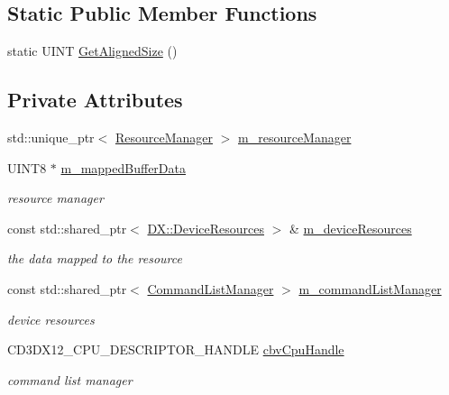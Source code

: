 \subsection*{Static Public Member Functions}
\begin{DoxyCompactItemize}
\item 
static U\+I\+NT \mbox{\hyperlink{class_constant_buffer_manager_a422de25f4764115e3bb1a747f231c7bd}{Get\+Aligned\+Size}} ()
\end{DoxyCompactItemize}
\subsection*{Private Attributes}
\begin{DoxyCompactItemize}
\item 
std\+::unique\+\_\+ptr$<$ \mbox{\hyperlink{class_resource_manager}{Resource\+Manager}} $>$ \mbox{\hyperlink{class_constant_buffer_manager_a8302ee559cb53baaf2233fcb20b867b4}{m\+\_\+resource\+Manager}}
\item 
U\+I\+N\+T8 $\ast$ \mbox{\hyperlink{class_constant_buffer_manager_a35b50fb75b21a3b98adca908b5c144c6}{m\+\_\+mapped\+Buffer\+Data}}
\begin{DoxyCompactList}\small\item\em resource manager \end{DoxyCompactList}\item 
const std\+::shared\+\_\+ptr$<$ \mbox{\hyperlink{class_d_x_1_1_device_resources}{D\+X\+::\+Device\+Resources}} $>$ \& \mbox{\hyperlink{class_constant_buffer_manager_a9514f5810d4492698ed04c48e67ef7e0}{m\+\_\+device\+Resources}}
\begin{DoxyCompactList}\small\item\em the data mapped to the resource \end{DoxyCompactList}\item 
const std\+::shared\+\_\+ptr$<$ \mbox{\hyperlink{class_command_list_manager}{Command\+List\+Manager}} $>$ \mbox{\hyperlink{class_constant_buffer_manager_aae03042ae999bf171e8dcffefdd4be63}{m\+\_\+command\+List\+Manager}}
\begin{DoxyCompactList}\small\item\em device resources \end{DoxyCompactList}\item 
C\+D3\+D\+X12\+\_\+\+C\+P\+U\+\_\+\+D\+E\+S\+C\+R\+I\+P\+T\+O\+R\+\_\+\+H\+A\+N\+D\+LE \mbox{\hyperlink{class_constant_buffer_manager_a93a791fc03c70ddfbdcd59ce0e207c7a}{cbv\+Cpu\+Handle}}
\begin{DoxyCompactList}\small\item\em command list manager \end{DoxyCompactList}\item 

\end{DoxyCompactItemize}
